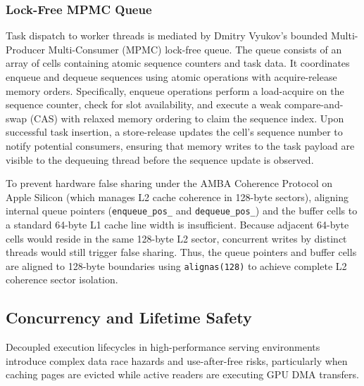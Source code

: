 \documentclass[conference,10pt]{IEEEtran}
\begin{document}
\subsubsection{Lock-Free MPMC Queue}
Task dispatch to worker threads is mediated by Dmitry Vyukov's bounded Multi-Producer Multi-Consumer (MPMC) lock-free queue. The queue consists of an array of cells containing atomic sequence counters and task data. It coordinates enqueue and dequeue sequences using atomic operations with acquire-release memory orders. Specifically, enqueue operations perform a load-acquire on the sequence counter, check for slot availability, and execute a weak compare-and-swap (CAS) with relaxed memory ordering to claim the sequence index. Upon successful task insertion, a store-release updates the cell's sequence number to notify potential consumers, ensuring that memory writes to the task payload are visible to the dequeuing thread before the sequence update is observed. 

To prevent hardware false sharing under the AMBA Coherence Protocol on Apple Silicon (which manages L2 cache coherence in 128-byte sectors), aligning internal queue pointers (\texttt{enqueue\_pos\_} and \texttt{dequeue\_pos\_}) and the buffer cells to a standard 64-byte L1 cache line width is insufficient. Because adjacent 64-byte cells would reside in the same 128-byte L2 sector, concurrent writes by distinct threads would still trigger false sharing. Thus, the queue pointers and buffer cells are aligned to 128-byte boundaries using \texttt{alignas(128)} to achieve complete L2 coherence sector isolation.

\subsection{Concurrency and Lifetime Safety}
\label{subsec:sys-concurrency}

Decoupled execution lifecycles in high-performance serving environments introduce complex data race hazards and use-after-free risks, particularly when caching pages are evicted while active readers are executing GPU DMA transfers.
\end{document}
